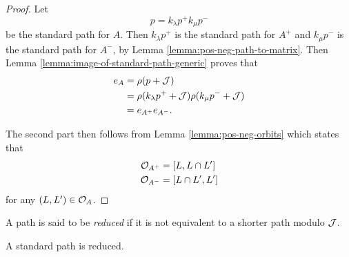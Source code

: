 \documentclass[a4paper, 11pt, twoside]{report}
\begin{document}
\begin{proof}
Let
\begin{equation*}
p=k_\lambda p^+ k_\mu p^-
\end{equation*}
be the standard path for $A$. Then $k_\lambda p^+$ is the standard path for $A^+$ and $k_\mu p^-$ is the standard path for $A^-$, by Lemma \ref{lemma:pos-neg-path-to-matrix}. Then Lemma \ref{lemma:image-of-standard-path-generic} proves that
\begin{align*}
e_A
&= \rho(p+\mathcal{J})\\
&= \rho(k_\lambda p^+ +\mathcal{J})\rho(k_\mu p^- +\mathcal{J})\\
&= e_{A^+}e_{A^-}.
\end{align*}

The second part then follows from Lemma \ref{lemma:pos-neg-orbits} which states that
\begin{align*}
\mathcal{O}_{A^+} &= [L,L\cap L']\\
\mathcal{O}_{A^-} &= [L\cap L',L']
\end{align*}
for any $(L,L')\in\mathcal{O}_{A}$.
\end{proof}

\begin{definition}\label{def:reduced-path}
A path is said to be \emph{reduced} if it is not equivalent to a shorter path modulo $\mathcal{J}$.
\end{definition}

\begin{lemma}\label{lemma:standard-path-reduced}
A standard path is reduced.
\end{lemma}
\end{document}
